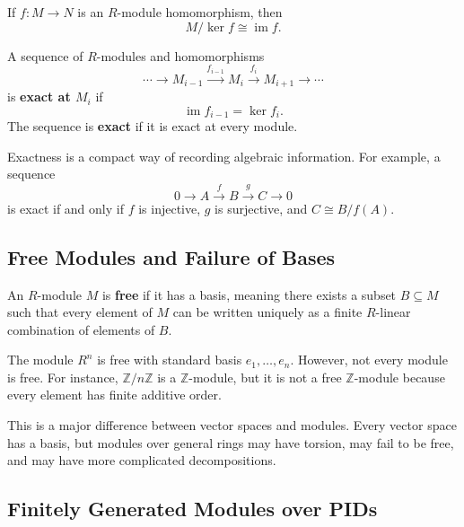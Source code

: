 \begin{theorem}
If $f:M\to N$ is an $R$-module homomorphism, then
\[
    M/\ker f\cong \operatorname{im}f.
\]
\end{theorem}

\begin{definition}
A sequence of $R$-modules and homomorphisms
\[
    \cdots\to M_{i-1}\xrightarrow{f_{i-1}}M_i\xrightarrow{f_i}M_{i+1}\to\cdots
\]
is \textbf{exact at $M_i$} if
\[
    \operatorname{im}f_{i-1}=\ker f_i.
\]
The sequence is \textbf{exact} if it is exact at every module.
\end{definition}

\begin{remark}
Exactness is a compact way of recording algebraic information. For example, a sequence
\[
    0\to A\xrightarrow{f}B\xrightarrow{g}C\to 0
\]
is exact if and only if $f$ is injective, $g$ is surjective, and $C\cong B/f(A)$.
\end{remark}

\subsection{Free Modules and Failure of Bases}

\begin{definition}
An $R$-module $M$ is \textbf{free} if it has a basis, meaning there exists a subset $B\subseteq M$ such that every element of $M$ can be written uniquely as a finite $R$-linear combination of elements of $B$.
\end{definition}

\begin{example}
The module $R^n$ is free with standard basis $e_1,\dots,e_n$. However, not every module is free. For instance, $\mathbb{Z}/n\mathbb{Z}$ is a $\mathbb{Z}$-module, but it is not a free $\mathbb{Z}$-module because every element has finite additive order.
\end{example}

\begin{remark}
This is a major difference between vector spaces and modules. Every vector space has a basis, but modules over general rings may have torsion, may fail to be free, and may have more complicated decompositions.
\end{remark}

\subsection{Finitely Generated Modules over PIDs}

